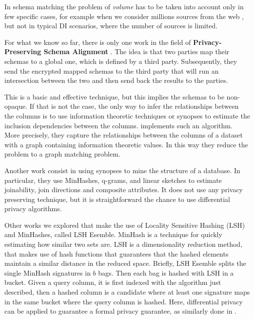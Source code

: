 \documentclass[12pt]{article}
\begin{document}
In schema matching the problem of \textit{volume} has to be taken into account only in few specific cases, for example when we consider millions sources from the web \cite*{Pimplikar2012}, but not in typical DI scenarios, 
where the number of sources is limited.

For what we know so far, there is only one work in the field of \textbf{Privacy-Preserving Schema Alignment} \cite*{scannapieco_privacy_2007}. The idea is that two parties map their schemas to a global one, which is defined by a third party. Subsequently, they send the encrypted mapped schemas to the third party that will run an intersection between the two and then send back the results to the parties. 

This is a basic and effective technique, but this implies the schemas to be non-opaque. If that is not the case, the only way to infer the relationships between the columns is to use information theoretic techniques or synopses to estimate the inclusion dependencies between the columns. \cite*{kang_schema_nodate} implements such an algorithm. More precisely, they capture the relationships between the columns of a dataset with a graph containing information theoretic values. In this way they reduce the problem to a graph matching problem. 

Another work \cite*{Dasu2002} consist in using synopses to mine the structure of a database. In particular, they use MinHashes, q-grams, and linear sketches to estimate joinability, join directions and composite attributes. It does not use any privacy preserving technique, but it is straightforward the chance to use differential privacy algorithms.

Other works \cite*{zhu_lsh_2016} we explored that make the use of Locality Sensitive Hashing (LSH) and MinHashes, called LSH Esemble. MinHash is a technique for quickly estimating how similar two sets are. LSH is a dimensionality reduction method, that makes use of hash functions that guarantees that the hashed elements maintain a similar distance in the reduced space. Briefly, LSH Esemble splits the single MinHash signatures in $b$ bags. Then each bag is hashed with LSH in a bucket. Given a query column, it is first indexed with the algorithm just described, then a hashed column is a candidate where at least one signature maps in the same bucket where the query column is hashed. Here, differential privacy can be applied to guarantee a formal privacy guarantee, as similarly done in \cite*{fernandes_locality_2021}. 
\end{document}
